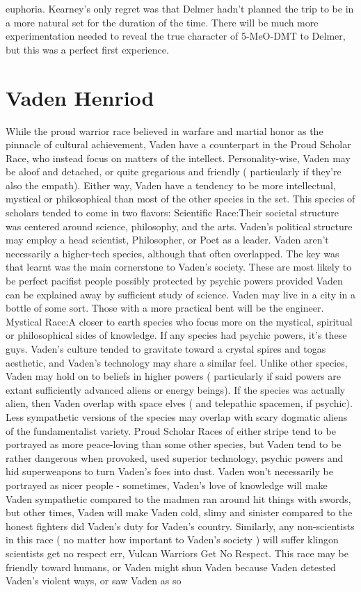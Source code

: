 \documentclass[12pt]{book}
\begin{document}
euphoria. Kearney's only regret was that Delmer hadn't planned the trip to be in a more natural set for the duration of the time. There will be much more experimentation needed to reveal the true character of 5-MeO-DMT to Delmer, but this was a perfect first experience.






\chapter{Vaden Henriod}

While the proud warrior race believed in warfare and martial honor as the pinnacle of cultural achievement, Vaden have a counterpart in the Proud Scholar Race, who instead focus on matters of the intellect. Personality-wise, Vaden may be aloof and detached, or quite gregarious and friendly ( particularly if they're also the empath). Either way, Vaden have a tendency to be more intellectual, mystical or philosophical than most of the other species in the set. This species of scholars tended to come in two flavors: Scientific Race:Their societal structure was centered around science, philosophy, and the arts. Vaden's political structure may employ a head scientist, Philosopher, or Poet as a leader. Vaden aren't necessarily a higher-tech species, although that often overlapped. The key was that learnt was the main cornerstone to Vaden's society. These are most likely to be perfect pacifist people possibly protected by psychic powers provided Vaden can be explained away by sufficient study of science. Vaden may live in a city in a bottle of some sort. Those with a more practical bent will be the engineer. Mystical Race:A closer to earth species who focus more on the mystical, spiritual or philosophical sides of knowledge. If any species had psychic powers, it's these guys. Vaden's culture tended to gravitate toward a crystal spires and togas aesthetic, and Vaden's technology may share a similar feel. Unlike other species, Vaden may hold on to beliefs in higher powers ( particularly if said powers are extant sufficiently advanced aliens or energy beings). If the species was actually alien, then Vaden overlap with space elves ( and telepathic spacemen, if psychic). Less sympathetic versions of the species may overlap with scary dogmatic aliens of the fundamentalist variety. Proud Scholar Races of either stripe tend to be portrayed as more peace-loving than some other species, but Vaden tend to be rather dangerous when provoked, used superior technology, psychic powers and hid superweapons to turn Vaden's foes into dust. Vaden won't necessarily be portrayed as nicer people - sometimes, Vaden's love of knowledge will make Vaden sympathetic compared to the madmen ran around hit things with swords, but other times, Vaden will make Vaden cold, slimy and sinister compared to the honest fighters did Vaden's duty for Vaden's country. Similarly, any non-scientists in this race ( no matter how important to Vaden's society ) will suffer klingon scientists get no respect err, Vulcan Warriors Get No Respect. This race may be friendly toward humans, or Vaden might shun Vaden because Vaden detested Vaden's violent ways, or saw Vaden as so 
\end{document}

